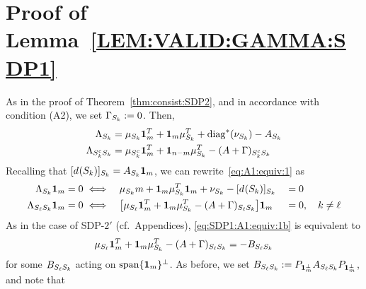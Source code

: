 \appendix












\section{Proof of Lemma~\ref{LEM:VALID:GAMMA:SDP1}}\label{sec:proof:valid:Gamma:SDP1}
As in the proof of Theorem~\ref{thm:consist:SDP2}, and in accordance with condition (A2), we set $\Gamma_{S_{k}} := 0$.
Then, 
\begin{align}
  \label{eq:Lambda:def:SDP1}
  \begin{split}
    \Lambda_{S_{k}} &= \mu_{S_{k}}  \bm{1}_m^T + \bm{1}_m \mu_{S_{k}}^T + \operatorname{diag}^*(\nu_{S_{k}})- A_{S_{k}} \\
    \Lambda_{S_{k}^c S_{k}} &= \mu_{S_{k}^c}  \bm{1}_m^T + \bm{1}_{n-m} \mu_{S_{k}}^T - (A+\Gamma)_{S_{k}^c S_{k}} 
  \end{split}
\end{align}
Recalling that $[d_{}(S_{k})]_{S_{k}} = A_{S_{k}} \bm{1}_m$, we can rewrite~\eqref{eq:A1:equiv:1} as 
\begin{alignat}{4}
 \label{eq:SDP1:A1:equiv:1a}
  \Lambda_{S_{k}} \bm{1}_m = 0  &\iff 
    && \mu_{S_{k}} m + \bm{1}_m \mu_{S_{k}}^T \bm{1}_m + \nu_{S_{k}} - [d_{}(S_{k})]_{S_{k}} &&= 0 \\
 \label{eq:SDP1:A1:equiv:1b}
  \Lambda_{S_{\ell}S_{k}} \bm{1}_m = 0 &\iff 
    && \big[\mu_{S_{\ell}} \bm{1}_m^T + \bm{1}_m \mu_{S_{k}}^T - (A+\Gamma)_{S_{\ell} S_{k}}\big] \bm{1}_m &&= 0 , \quad k \neq \ell
 \end{alignat}
As in the case of SDP-$2'$ (cf.~Appendices), \eqref{eq:SDP1:A1:equiv:1b} is equivalent to
\begin{align*}
  \mu_{S_{\ell}} \bm{1}_m^T + \bm{1}_m \mu_{S_{k}}^T - (A+\Gamma)_{S_{\ell} S_{k}} = - B_{S_{\ell}S_{k}}
\end{align*}
for some $B_{S_{\ell}S_{k}}$ acting on $\operatorname{span}\{\bm{1}_m\}^\perp$. As before, we set $B_{S_{\ell}S_{k}}:=P_{\bm{1}_m^\perp} A_{S_{\ell}S_{k}} P_{\bm{1}_m^\perp}$, and note that
